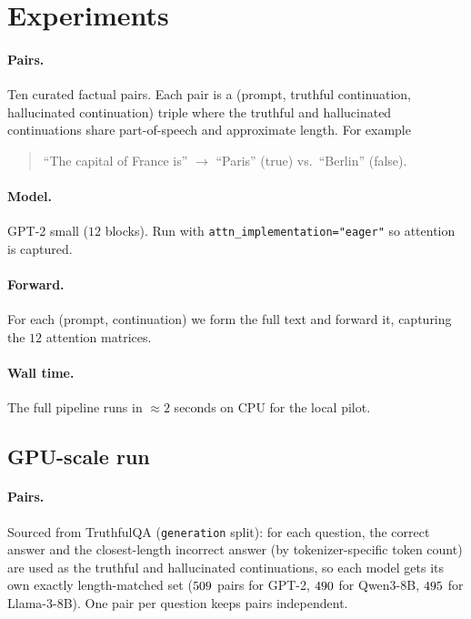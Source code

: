 \section{Experiments}
\paragraph{Pairs.} Ten curated factual pairs. Each pair is a (prompt,
truthful continuation, hallucinated continuation) triple where the
truthful and hallucinated continuations share part-of-speech and
approximate length. For example
\begin{quote}\small
``The capital of France is'' $\to$ ``Paris'' (true) vs.\ ``Berlin'' (false).
\end{quote}

\paragraph{Model.} GPT-2 small ($12$ blocks). Run with
\texttt{attn\_implementation="eager"} so attention is captured.

\paragraph{Forward.} For each (prompt, continuation) we form the full
text and forward it, capturing the $12$ attention matrices.

\paragraph{Wall time.} The full pipeline runs in $\approx 2$ seconds
on CPU for the local pilot.

\subsection{GPU-scale run}
\paragraph{Pairs.} Sourced from TruthfulQA (\texttt{generation} split):
for each question, the correct answer and the closest-length incorrect
answer (by tokenizer-specific token count) are used as the truthful and
hallucinated continuations, so each model gets its own exactly
length-matched set ($509$ pairs for GPT-2,
$490$ for Qwen3-8B, $495$ for
Llama-3-8B). One pair per question keeps pairs independent.

